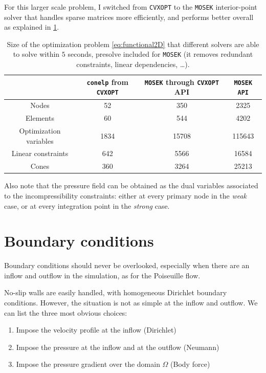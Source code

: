 \documentclass[11 pt]{report}
\begin{document}
For this larger scale problem, I switched from \texttt{CVXOPT} to the \texttt{MOSEK} interior-point solver \cite{mosek} that handles sparse matrices more efficiently, and performs better overall as explained in \cref{tab:solvers}.
\begin{table}[h]
    \centering
    \begin{tabular}[t]{cccc}
        \toprule
         & \texttt{conelp} from \texttt{CVXOPT} \quad & \quad  \texttt{MOSEK} through \texttt{CVXOPT} API \quad & \quad \texttt{MOSEK API}\\
        \midrule
        Nodes & 52 & 350 & 2325\\
        Elements & 60 & 544 & 4202\\
        \midrule
        Optimization variables & 1834 & 15708 & 115643\\
        Linear constraints & 642 & 5566 & 16584\\
        Cones & 360 & 3264 & 25213\\
        \bottomrule
    \end{tabular}
    \caption{Size of the optimization problem \eqref{eq:functional2D} that different solvers are able to solve within $5$ seconds, presolve included for \texttt{MOSEK} (it removes redundant constraints, linear dependencies, \dots).}
    \label{tab:solvers}
\end{table}%


Also note that the pressure field can be obtained as the dual variables associated to the incompressibility constraints: either at every primary node in the \textit{weak} case, or at every integration point in the \textit{strong} case.

\section{Boundary conditions}
\label{sec:boundary_conditions}
Boundary conditions should never be overlooked, especially when there are an inflow and outflow in the simulation, as for the Poiseuille flow.

No-slip walls are easily handled, with homogeneous Dirichlet boundary conditions. However, the situation is not as simple at the inflow and outflow. We can list the three most obvious choices:
\begin{enumerate}
    \item Impose the velocity profile at the inflow (Dirichlet)
    \item Impose the pressure at the inflow and at the outflow (Neumann)
    \item Impose the pressure gradient over the domain $\Omega$ (Body force)
\end{enumerate}
\end{document}
